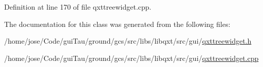 Definition at line 170 of file qxttreewidget.\-cpp.



The documentation for this class was generated from the following files\-:\begin{DoxyCompactItemize}
\item 
/home/jose/\-Code/gui\-Tau/ground/gcs/src/libs/libqxt/src/gui/\hyperlink{qxttreewidget_8h}{qxttreewidget.\-h}\item 
/home/jose/\-Code/gui\-Tau/ground/gcs/src/libs/libqxt/src/gui/\hyperlink{qxttreewidget_8cpp}{qxttreewidget.\-cpp}\end{DoxyCompactItemize}
